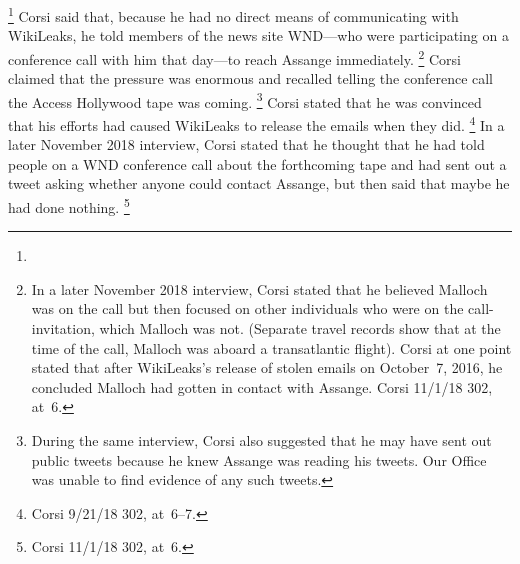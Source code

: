 \footnote{}
Corsi said that, because he had no direct means of communicating with WikiLeaks, he told members of the news site WND---who were participating on a conference call with him that day---to reach Assange immediately.%
\footnote{In a later November 2018 interview, Corsi stated  that he believed Malloch was on the call but then focused on other individuals who were on the call-invitation, which Malloch was not.
(Separate travel records show that at the time of the call, Malloch was aboard a transatlantic flight).
Corsi at one point stated that after WikiLeaks's release of stolen emails on October~7, 2016, he concluded Malloch had gotten in contact with Assange.
Corsi 11/1/18 302, at~6.}
Corsi claimed that the pressure was enormous and recalled telling the conference call the Access Hollywood tape was coming.%
\footnote{During the same interview, Corsi also suggested that he may have sent out public tweets because he knew Assange was reading his tweets.
Our Office was unable to find evidence of any such tweets.}
Corsi stated that he was convinced that his efforts had caused WikiLeaks to release the emails when they did.%
\footnote{Corsi 9/21/18 302, at~6--7.}
In a later November 2018 interview, Corsi stated that he thought that he had told people on a WND conference call about the forthcoming tape and had sent out a tweet asking whether anyone could contact Assange, but then said that maybe he had done nothing.%
\footnote{Corsi 11/1/18 302, at~6.}

